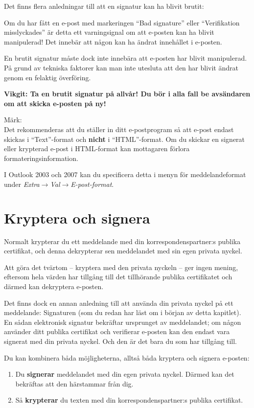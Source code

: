 \documentclass[a4paper,11pt, oneside,openright,titlepage,dvips]{scrbook}
\newcommand{\Menu}[1]{\emph{#1}}
\newcounter{part}
\newcounter{chapter}
\newcounter{section}[chapter]
\begin{document}
Det finns flera anledningar till att en signatur kan ha blivit brutit:

Om du har fått en e-post med markeringen "`Bad signature"'
eller "`Verifikation misslyckades"' är detta ett varningsignal
om att e-posten kan ha blivit manipulerad! Det innebär att någon
kan ha ändrat innehållet i e-posten.

En brutit signatur måste dock inte innebära att e-posten
har blivit manipulerad.
På grund av tekniska faktorer kan man inte utesluta att
den har blivit ändrat genom en felaktig överföring.


\textbf{Vikgit: Ta en brutit signatur på allvår! Du bör i alla fall
be avsändaren om att skicka e-posten på ny!}

Märk: \\
Det rekommenderas att du ställer in ditt e-postprogram så
att e-post endast skickas i "`Text"'-format och
\textbf{nicht} i "`HTML"'-format.
Om du skickar en signerat eller krypterad e-post i HTML-format kan
mottagaren förlora formateringsinformation.

I Outlook 2003 och 2007 kan du specificera detta i menyn för meddelandeformat under
\Menu{Extra$\rightarrow$Val$\rightarrow$E-post-format}.



\clearpage
\section{Kryptera och signera}
\label{sec_encsig}

Normalt krypterar du ett meddelande med din korrespondenspartner:s 
publika certifikat, och denna dekrypterar sen meddelandet med sin
egen privata nyckel.

Att göra det tvärtom -- kryptera med den privata nyckeln -- ger ingen
mening, eftersom hela värden har tillgång till det tillhörande publika
certifikatet och därmed kan dekryptera e-posten.

Det finns dock en annan anledning till att använda din privata nyckel
på ett meddelande: Signaturen (som du redan har läst om i början av
detta kapitlet).
En sådan elektronisk signatur bekräftar ursprunget av meddelandet; om
någon använder ditt publika certifikat och verifierar e-posten
kan den endast vara signerat med din privata nyckel. Och den är det
bara du som har tillgång till.

Du kan kombinera båda möjligheterna, alltså båda
kryptera och signera e-posten:

\begin{enumerate}
    \item Du \textbf{signerar} meddelandet med din egen privata
  nyckel. Därmed kan det bekräftas att den härstammar från dig.
\item Så \textbf{krypterar} du texten med din korrespondenspartner:s
  publika certifikat.
\end{enumerate}
\end{document}

